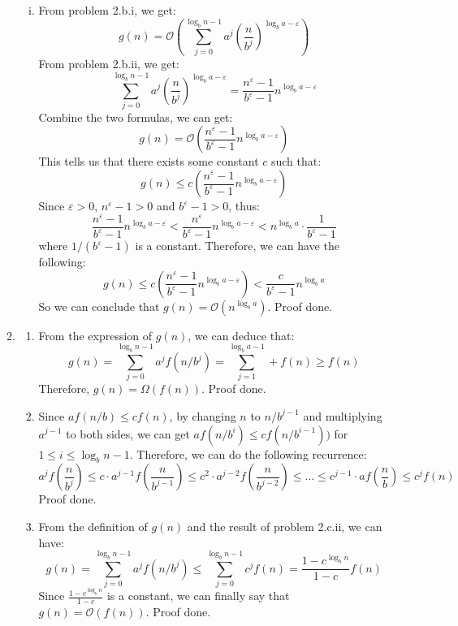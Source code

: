 \documentclass[12pt, a4paper]{article}
\begin{document}
\begin{enumerate}
\begin{enumerate}
\begin{enumerate}[i)]
            \item From problem 2.b.i, we get:
                  $$g(n) = \mathcal{O}(\sum_{j=0}^{\log_b n - 1} a^j (\frac{n}{b^j})^{\log_b a - \varepsilon})$$
                  From problem 2.b.ii, we get:
                  $$\sum_{j=0}^{\log_b n-1} a^j(\frac{n}{b^j})^{\log_b a-\varepsilon} = \frac{n^\varepsilon - 1}{b^\varepsilon - 1}n^{\log_b a - \varepsilon}$$
                  Combine the two formulas, we can get:
                  $$g(n) = \mathcal{O}(\frac{n^\varepsilon - 1}{b^\varepsilon - 1}n^{\log_b a - \varepsilon})$$
                  This tells us that there exists some constant $c$ such that:
                  $$g(n) \leq c(\frac{n^\varepsilon - 1}{b^\varepsilon - 1}n^{\log_b a - \varepsilon})$$
                  Since $\varepsilon > 0$, $n^\varepsilon - 1> 0$ and $b^\varepsilon - 1 > 0$, thus:
                  $$\frac{n^\varepsilon - 1}{b^\varepsilon - 1}n^{\log_b a - \varepsilon} < \frac{n^\varepsilon}{b^\varepsilon - 1}n^{\log_b a - \varepsilon}
                  < n^{\log_b a}\cdot \frac{1}{b^\varepsilon - 1}$$
                  where $1/(b^\varepsilon - 1)$ is a constant. Therefore, we can have the following:
                  $$g(n) \leq c(\frac{n^\varepsilon - 1}{b^\varepsilon - 1}n^{\log_b a - \varepsilon}) < \frac{c}{b^\varepsilon - 1}n^{\log_b a}$$
                  So we can conclude that $g(n) = \mathcal{O}(n^{\log_b a})$. Proof done.
        \end{enumerate}

        \item \begin{enumerate}
            \item From the expression of $g(n)$, we can deduce that:
                  $$g(n) = \sum_{j=0}^{\log_b n - 1} a^j f(n/b^j) = \sum_{j=1}^{\log_b a - 1} + f(n) \geq f(n)$$
                  Therefore, $g(n) = \Omega(f(n))$. Proof done.

            \item Since $af(n/b) \leq cf(n)$, by changing $n$ to $n/b^{j-1}$ and multiplying $a^{j-1}$ to both sides, 
                  we can get $af(n / b^i) \leq cf(n/b^{i-1}))$ for $1 \leq i \leq \log_b n - 1$. Therefore, we can do the following recurrence:
                  $$a^jf(\frac{n}{b^j}) \leq c\cdot a^{j-1}f(\frac{n}{b^{j-1}}) \leq c^2\cdot a^{j-2}f(\frac{n}{b^{j-2}}) \leq \dots \leq 
                  c^{j-1}\cdot af(\frac{n}{b}) \leq c^j f(n)$$
                  Proof done.
            
            \item From the definition of $g(n)$ and the result of problem 2.c.ii, we can have:
                  $$g(n) = \sum_{j=0}^{\log_b n - 1} a^j f(n/b^j) \leq \sum_{j=0}^{\log_b n - 1} c^j f(n) = \frac{1 - c^{\log_b n}}{1 - c} f(n)$$
                  Since $\frac{1 - c^{\log_b n}}{1 - c}$ is a constant, we can finally say that $g(n) = \mathcal{O}(f(n))$. Proof done.


\end{enumerate}
\end{enumerate}
\end{enumerate}
\end{document}
